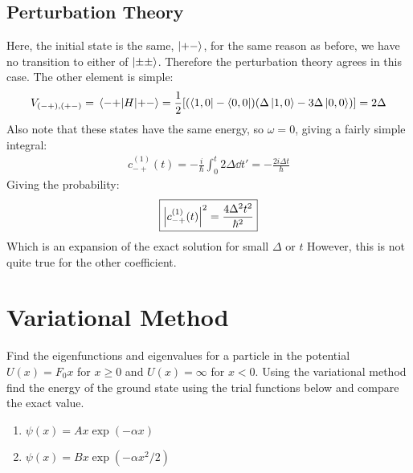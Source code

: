 \documentclass[12pt]{article}
\begin{document}
\subsection{Perturbation Theory}
Here, the initial state is the same, $\ket{+-}$, for the same reason as before, we have no transition to either of $\ket{\pm\pm}$. Therefore the perturbation theory agrees in this case. The other element is simple:
\begin{align*}
  V_{(-+),(+-)}=\mel{-+}{H}{+-}=\frac12\qty[\qty(\bra{1,0}-\bra{0,0})
  \qty(\Delta\ket{1,0}-3\Delta\ket{0,0})]=
  2\Delta
\end{align*}
Also note that these states have the same energy, so $\omega=0$, giving a fairly simple integral:
\begin{align*}
  c_{-+}^{(1)}(t)=-\frac{i}{\hbar}\int_0^t2\Delta\dd{t'}=
  -\frac{2i\Delta t}\hbar
\end{align*}
Giving the probability:
\begin{align}
  \boxed{\abs{c_{-+}^{(1)}(t)}^2=\frac{4\Delta^2t^2}{\hbar^2}}
\end{align}
Which is an expansion of the exact solution for small $\Delta$ or $t$ However, this is not quite true for the other coefficient.

\section{Variational Method}
\begin{problem}
  Find the eigenfunctions and eigenvalues for a particle in the potential $U(x)=F_0x$ for $x\geq 0$ and $U(x)=\infty$ for $x<0$. Using the variational method find the energy of the ground state using the trial functions below and compare the exact value.
  \begin{enumerate}[label=(\arabic*)]
  \item $\psi(x)=Ax\exp(-\alpha x)$
  \item $\psi(x)=Bx\exp(-\alpha x^2/2)$
  \end{enumerate}
\end{problem}
\end{document}
